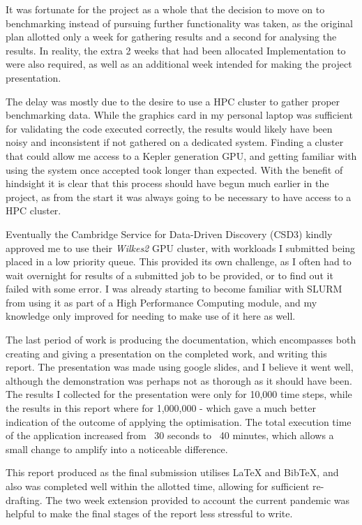 It was fortunate for the project as a whole that the decision to move on to benchmarking instead of pursuing further functionality was taken, as the original plan allotted only a week for gathering results and a second for analysing the results. In reality, the extra 2 weeks that had been allocated Implementation to were also required, as well as an additional week intended for making the project presentation.
\par
The delay was mostly due to the desire to use a HPC cluster to gather proper benchmarking data. While the graphics card in my personal laptop was sufficient for validating the code executed correctly, the results would likely have been noisy and inconsistent if not gathered on a dedicated system. Finding a cluster that could allow me access to a Kepler generation GPU, and getting familiar with using the system once accepted took longer than expected. With the benefit of hindsight it is clear that this process should have begun much earlier in the project, as from the start it was always going to be necessary to have access to a HPC cluster.
\par
Eventually the Cambridge Service for Data-Driven Discovery (CSD3) kindly approved me to use their \textit{Wilkes2} GPU cluster, with workloads I submitted being placed in a low priority queue. This provided its own challenge, as I often had to wait overnight for results of a submitted job to be provided, or to find out it failed with some error. I was already starting to become familiar with SLURM from using it as part of a High Performance Computing module, and my knowledge only improved for needing to make use of it here as well.

The last period of work is producing the documentation, which encompasses both creating and giving a presentation on the completed work, and writing this report. The presentation was made using google slides, and I believe it went well, although the demonstration was perhaps not as thorough as it should have been. The results I collected for the presentation were only for 10,000 time steps, while the results in this report where for 1,000,000 - which gave a much better indication of the outcome of applying the optimisation. The total execution time of the application increased from ~30 seconds to ~40 minutes, which allows a small change to amplify into a noticeable difference.
\par
This report produced as the final submission utilises LaTeX and BibTeX, and also was completed well within the allotted time, allowing for sufficient re-drafting. The two week extension provided to account the current pandemic was helpful to make the final stages of the report less stressful to write.


